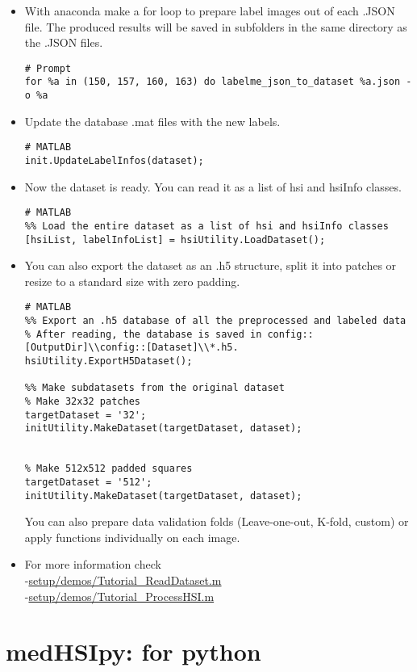 \documentclass{foxelas_report}
\begin{document}
\begin{enumerate}
\begin{itemize}
\item With anaconda make a for loop to prepare label images out of each .JSON file. The produced results will be saved in subfolders in the same directory as the .JSON files. 

\begin{lstlisting}
# Prompt
for %a in (150, 157, 160, 163) do labelme_json_to_dataset %a.json -o %a
\end{lstlisting}

\item Update the database .mat files with the new labels.

\begin{lstlisting}
# MATLAB
init.UpdateLabelInfos(dataset);
\end{lstlisting}

\item Now the dataset is ready. You can read it as a list of hsi and hsiInfo classes.

\begin{lstlisting}
# MATLAB
%% Load the entire dataset as a list of hsi and hsiInfo classes
[hsiList, labelInfoList] = hsiUtility.LoadDataset();
\end{lstlisting}

\item You can also export the dataset as an .h5 structure, split it into patches or resize to a standard size with zero padding.

\begin{lstlisting}
# MATLAB
%% Export an .h5 database of all the preprocessed and labeled data
% After reading, the database is saved in config::[OutputDir]\\config::[Dataset]\\*.h5.
hsiUtility.ExportH5Dataset();

%% Make subdatasets from the original dataset
% Make 32x32 patches
targetDataset = '32';
initUtility.MakeDataset(targetDataset, dataset);


% Make 512x512 padded squares
targetDataset = '512';
initUtility.MakeDataset(targetDataset, dataset);

\end{lstlisting}

You can also prepare data validation folds (Leave-one-out, K-fold, custom) or apply functions individually on each image. 

\item For more information check \\
-\url{setup/demos/Tutorial\_ReadDataset.m}\\
-\url{setup/demos/Tutorial\_ProcessHSI.m}
\end{itemize}

\end{enumerate}

\section{medHSIpy: for python}


\end{document}
